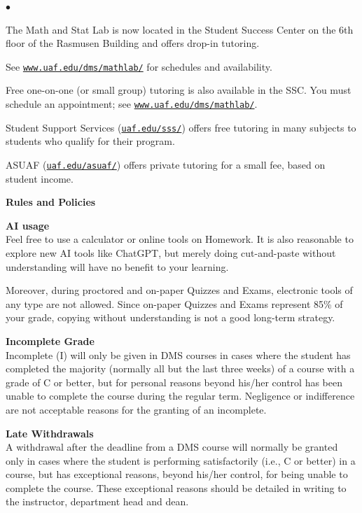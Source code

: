 \documentclass[12pt]{article}
\renewcommand{\emph}[1]{\textsf{\textbf{#1}}}
\newcommand{\localhead}[1]{\par\smallskip\textbf{#1} \smallskip\nobreak\\}%
\def\heading#1{\localhead{\large\emph{#1}}}
\def\subheading#1{\localhead{\emph{#1}}}
\newenvironment{clist}%
{\bgroup\parskip 0pt\begin{list}{$\bullet$}{\partopsep 4pt\topsep 0pt\itemsep -2pt}}%
{\end{list}\egroup}%
\begin{document}
\vskip -20pt\strut
\begin{clist}
    \item The Math and Stat Lab is now located in the
      Student Success Center on the 6th floor of the Rasmusen Building and
      offers drop-in tutoring.

	See \href{http://www.uaf.edu/dms/mathlab/}{\texttt{www.uaf.edu/dms/mathlab/}} for schedules and availability.
	\item Free
one-on-one (or small group) tutoring is also available in 
the SSC. You must schedule an
appointment; see \href{http://www.uaf.edu/dms/mathlab/}{\texttt{www.uaf.edu/dms/mathlab/}}.
	\item Student Support Services (\href{https://uaf.edu/sss/}{\texttt{uaf.edu/sss/}}) offers free tutoring in many subjects to students who qualify for their program.
	\item ASUAF (\href{https://uaf.edu/asuaf/}{\texttt{uaf.edu/asuaf/}}) offers private tutoring for a small fee, based on student income.
\end{clist}


\clearpage\newpage
\phantom{x}
\vspace{-4mm}

\heading{Rules and Policies}
\vskip -20pt

\subheading{AI usage}
Feel free to use a calculator or online tools on Homework.  It is also reasonable to explore new AI tools like ChatGPT, but merely doing cut-and-paste without understanding will have no benefit to your learning. 

Moreover, during proctored and on-paper Quizzes and Exams, electronic tools of any type are not allowed.  Since on-paper Quizzes and Exams represent 85\% of your grade, copying without understanding is not a good long-term strategy.

\subheading{Incomplete Grade} 
Incomplete (I) will only be given in
  DMS courses in cases where
  the student has completed the majority (normally all but the last
  three weeks) of a course with a grade of C or better, but for
  personal reasons beyond his/her control has been unable to complete
  the course during the regular term. Negligence or indifference are
  not acceptable reasons for the granting of an incomplete. 

\subheading{Late Withdrawals} 
A withdrawal after the deadline from a DMS course will
  normally be granted only in cases where the student is performing
  satisfactorily (i.e., C or better) in a course, but has exceptional
  reasons, beyond his/her control, for being unable to complete the
  course. These exceptional reasons should be detailed in writing to
  the instructor, department head and dean.
\end{document}
